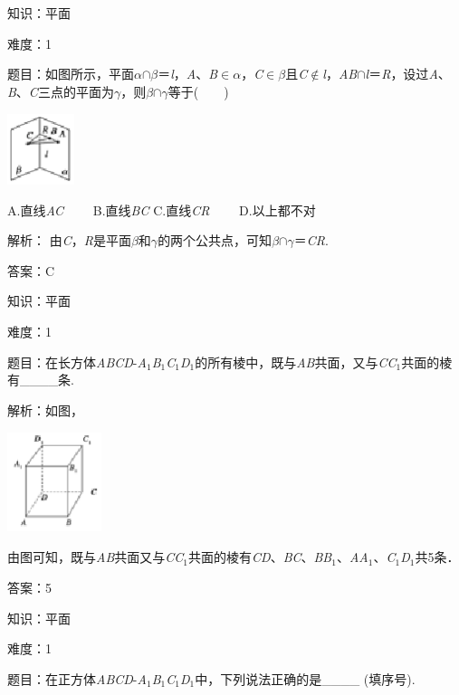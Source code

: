 \documentclass{article} %
\begin{document}
知识：平面

难度：1

题目：如图所示，平面\textit{$\alpha$}$\mathrm{\cap}$\textit{$\beta$}＝\textit{l}，\textit{A}、\textit{B}$\mathrm{\in}$\textit{$\alpha$}，\textit{C}$\mathrm{\in}$\textit{$\beta$}且\textit{C}$\mathrm{\notin}$\textit{l}，\textit{AB}$\mathrm{\cap}$\textit{l}＝\textit{R}，设过\textit{A}、\textit{B}、\textit{C}三点的平面为\textit{$\gamma$}，则\textit{$\beta$}$\mathrm{\cap}$\textit{$\gamma$}等于(　　)

\includegraphics*[width=0.77in, height=0.82in, keepaspectratio=false]{image86}

A.直线\textit{AC}　　 B.直线\textit{BC }C.直线\textit{CR}　　 D.以上都不对

解析：
由\textit{C}，\textit{R}是平面\textit{$\beta$}和\textit{$\gamma$}的两个公共点，可知\textit{$\beta$}$\mathrm{\cap}$\textit{$\gamma$}＝\textit{CR}.

答案：C

知识：平面

难度：1

题目：在长方体\textit{ABCD}-\textit{A}${}_{1}$\textit{B}${}_{1}$\textit{C}${}_{1}$\textit{D}${}_{1}$的所有棱中，既与\textit{AB}共面，又与\textit{CC}${}_{1}$共面的棱有\_\_\underbar{}\_\_条.

解析：如图，

\includegraphics*[width=1.08in, height=1.15in, keepaspectratio=false]{image87}

由图可知，既与\textit{AB}共面又与\textit{CC}${}_{1}$共面的棱有\textit{CD}、\textit{BC}、\textit{BB}${}_{1}$、\textit{AA}${}_{1}$、\textit{C}${}_{1}$\textit{D}${}_{1}$共5条．

答案：5

知识：平面

难度：1

题目：在正方体\textit{ABCD}-\textit{A}${}_{1}$\textit{B}${}_{1}$\textit{C}${}_{1}$\textit{D}${}_{1}$中，下列说法正确的是\_\_\underbar{}\_\_ (填序号).
\end{document}
